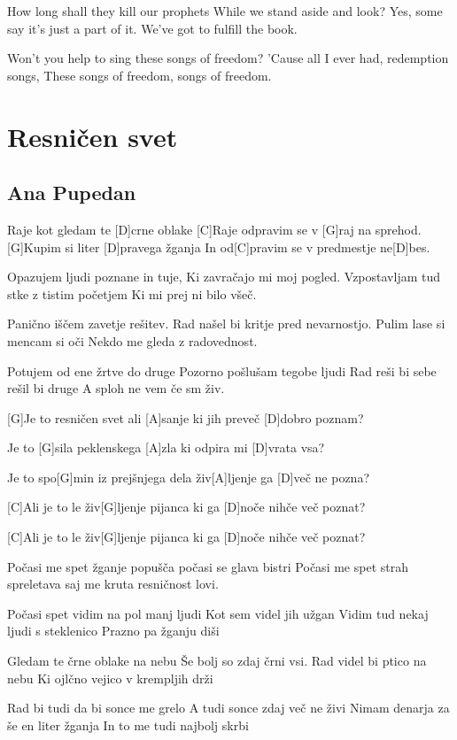 \documentclass[a4paper,12pt]{article}
\begin{document}
\begin{multicols}{2}
\begin{guitar}
How long shall they kill our prophets
While we stand aside and look?
Yes, some say it's just a part of it.
We've got to fulfill the book.


Won't you help to sing 
these songs of freedom?
'Cause all I ever had, redemption songs,
These songs of freedom, songs of freedom.



\end{guitar}
\section{Resničen svet}
\subsection*{Ana Pupedan}
\begin{guitar}
[G]Raje kot gledam te [D]crne oblake
[C]Raje odpravim se v [G]raj na sprehod.
[G]Kupim si liter [D]pravega žganja
In od[C]pravim se v predmestje ne[D]bes.


Opazujem ljudi poznane in tuje,
Ki zavračajo mi moj pogled.
Vzpostavljam tud stke z tistim početjem
Ki mi prej ni bilo všeč.


Panično iščem zavetje rešitev.
Rad našel bi kritje pred nevarnostjo.
Pulim lase si mencam si oči
Nekdo me gleda z radovednost.


Potujem od ene žrtve do druge
Pozorno pošlušam tegobe ljudi
Rad reši bi sebe rešil bi druge
A sploh ne vem če sm živ.


[G]Je to resničen svet ali [A]sanje 
ki jih preveč [D]dobro poznam?


Je to [G]sila peklenskega [A]zla 
ki odpira mi [D]vrata vsa?


Je to spo[G]min iz prejšnjega dela 
živ[A]ljenje ga [D]več ne pozna?


[C]Ali je to le živ[G]ljenje pijanca 
ki ga [D]noče nihče več poznat?


[C]Ali je to le živ[G]ljenje pijanca 
ki ga [D]noče nihče več poznat?


Počasi me spet žganje popušča
počasi se glava bistri
Počasi me spet strah spreletava
saj me kruta resničnost lovi.


Počasi spet vidim na pol manj ljudi
Kot sem videl jih užgan
Vidim tud nekaj ljudi s steklenico
Prazno pa žganju diši


Gledam te črne oblake na nebu
Še bolj so zdaj črni vsi.
Rad videl bi ptico na nebu
Ki ojlčno vejico v krempljih drži


Rad bi tudi da bi sonce me grelo
A tudi sonce zdaj več ne živi
Nimam denarja za še en liter žganja
In to me tudi najbolj skrbi



\end{guitar}
\end{multicols}
\end{document}
